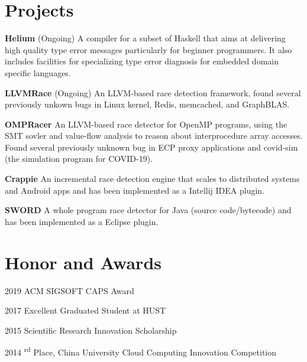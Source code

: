 \documentclass[12pt,letterpaper]{report}
\newcommand{\listtabwidth}{1.75cm}
\begin{document}
	\section*{Projects}
	
	\begin{tablist}
		\item[\textbf{Helium}]
		\tab (Ongoing) A compiler for a subset of Haskell that aims at delivering high quality type error messages particularly for beginner programmers. It also includes facilities for specializing type error diagnosis for embedded domain specific languages.
		\item[\textbf{LLVMRace}]
		\tab (Ongoing) An LLVM-based race detection framework, found several previously unkown bugs in Linux kernel, Redis, memcached, and GraphBLAS.
		\item[\textbf{OMPRacer}] 
		\tab An LLVM-based race detector for OpenMP programs, 
		using the SMT sovler and value-flow analysis to reason about interprocedure array accesses.\\
		Found several previously unknown bug in ECP proxy applications and covid-sim (the simulation program for COVID-19).
		\item[\textbf{Crappie}] 
		\tab An incremental race detection engine that scales to distributed systems and Android apps and has been implemented as a Intellij IDEA plugin.
		\item[\textbf{SWORD}] 
		\tab A whole program race detector for Java (source code/bytecode) and has been implemented as a Eclipse plugin.
	\end{tablist}
\renewcommand{\listtabwidth}{1.75cm}


\section*{Honor and Awards}

\begin{tablist}
	\item[2019] \tab ACM SIGSOFT CAPS Award
	\item[2017] \tab Excellent Graduated Student at HUST
	\item[2015] \tab Scientific Research Innovation Scholarship
	\item[2014] \textsuperscript{rd} Place, China University Cloud Computing Innovation Competition
\end{tablist}
\end{document}
